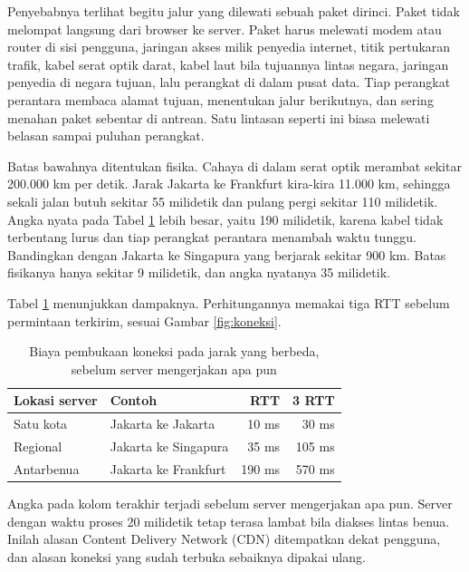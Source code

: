 Penyebabnya terlihat begitu jalur yang dilewati sebuah paket dirinci. Paket
tidak melompat langsung dari browser ke server. Paket harus melewati modem atau
router di sisi pengguna, jaringan akses milik penyedia internet, titik
pertukaran trafik, kabel serat optik darat, kabel laut bila tujuannya lintas
negara, jaringan penyedia di negara tujuan, lalu perangkat di dalam pusat data.
Tiap perangkat perantara membaca alamat tujuan, menentukan jalur berikutnya,
dan sering menahan paket sebentar di antrean. Satu lintasan seperti ini biasa
melewati belasan sampai puluhan perangkat.

Batas bawahnya ditentukan fisika. Cahaya di dalam serat optik merambat sekitar
200.000 km per detik. Jarak Jakarta ke Frankfurt kira-kira 11.000 km, sehingga
sekali jalan butuh sekitar 55 milidetik dan pulang pergi sekitar 110 milidetik.
Angka nyata pada Tabel \ref{tab:rtt} lebih besar, yaitu 190 milidetik, karena
kabel tidak terbentang lurus dan tiap perangkat perantara menambah waktu
tunggu. Bandingkan dengan Jakarta ke Singapura yang berjarak sekitar 900 km.
Batas fisikanya hanya sekitar 9 milidetik, dan angka nyatanya 35 milidetik.

Tabel \ref{tab:rtt} menunjukkan dampaknya. Perhitungannya memakai tiga RTT
sebelum permintaan terkirim, sesuai Gambar \ref{fig:koneksi}.

\begin{table}[!htb]
  \centering
  \caption{Biaya pembukaan koneksi pada jarak yang berbeda, sebelum server
           mengerjakan apa pun}
  \label{tab:rtt}
  \begin{tabularx}{\textwidth}{lXrr}
    \hline
    \textbf{Lokasi server} & \textbf{Contoh} & \textbf{RTT} & \textbf{3 RTT} \\
    \hline
    Satu kota      & Jakarta ke Jakarta      & 10 ms  & 30 ms  \\
    \hline
    Regional       & Jakarta ke Singapura    & 35 ms  & 105 ms \\
    \hline
    Antarbenua     & Jakarta ke Frankfurt    & 190 ms & 570 ms \\
    \hline
  \end{tabularx}
\end{table}

Angka pada kolom terakhir terjadi sebelum server mengerjakan apa pun. Server
dengan waktu proses 20 milidetik tetap terasa lambat bila diakses lintas benua.
Inilah alasan Content Delivery Network (CDN) ditempatkan dekat pengguna, dan
alasan koneksi yang sudah terbuka sebaiknya dipakai ulang.

